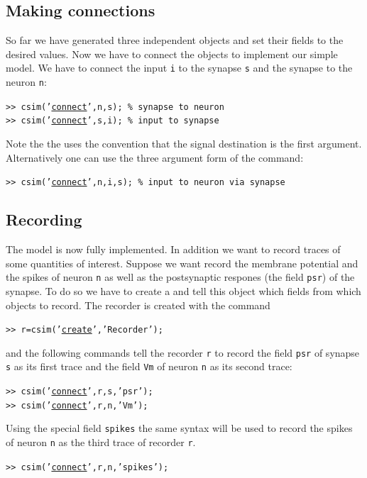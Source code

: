 \subsection{Making connections}
So far we have generated three independent objects and set
their fields to the desired values. Now we have to connect the objects
to implement our simple model. We have to connect the input \texttt{i}
to the synapse \texttt{s} and the synapse to the neuron \texttt{n}:
%
\begin{tabbing}
\quad\tt>> csim('\hyperlink{cmd:connect}{connect}',n,s); \% synapse to neuron \\
\quad\tt>> csim('\hyperlink{cmd:connect}{connect}',s,i); \% input to synapse
\end{tabbing}
%
Note the the  uses the convention
that the signal destination is the first argument. Alternatively one
can use the three argument form of the command:
\begin{tabbing}
\quad\tt>> csim('\hyperlink{cmd:connect}{connect}',n,i,s); \% input to neuron via synapse
\end{tabbing}

\subsection{Recording}  The model is now fully
implemented. In addition we want to record traces of some quantities
of interest. Suppose we want record the membrane potential and the
spikes of neuron \texttt{n} as well as the postsynaptic respones (the
field \texttt{psr}) of the synapse. To do so we have to create a
 and tell this object which
fields from which objects to record. The recorder is created with the
command
%
\begin{tabbing}
\quad\tt>> r=csim('\hyperlink{cmd:create}{create}','Recorder');
\end{tabbing}
%
and the following commands tell the recorder \texttt{r} to record the
field \texttt{psr} of synapse \texttt{s} as its first trace and the
field \texttt{Vm} of neuron \texttt{n} as its second trace:
%
\begin{tabbing}
\quad\tt>> csim('\hyperlink{cmd:connect}{connect}',r,s,'psr'); \\
\quad\tt>> csim('\hyperlink{cmd:connect}{connect}',r,n,'Vm');   \\
\end{tabbing}
%
Using the special field \texttt{spikes} the same syntax will be used
to record the spikes of neuron \texttt{n} as the third trace of
recorder \texttt{r}.
\begin{tabbing}
\quad\tt>> csim('\hyperlink{cmd:connect}{connect}',r,n,'spikes');
\end{tabbing}

